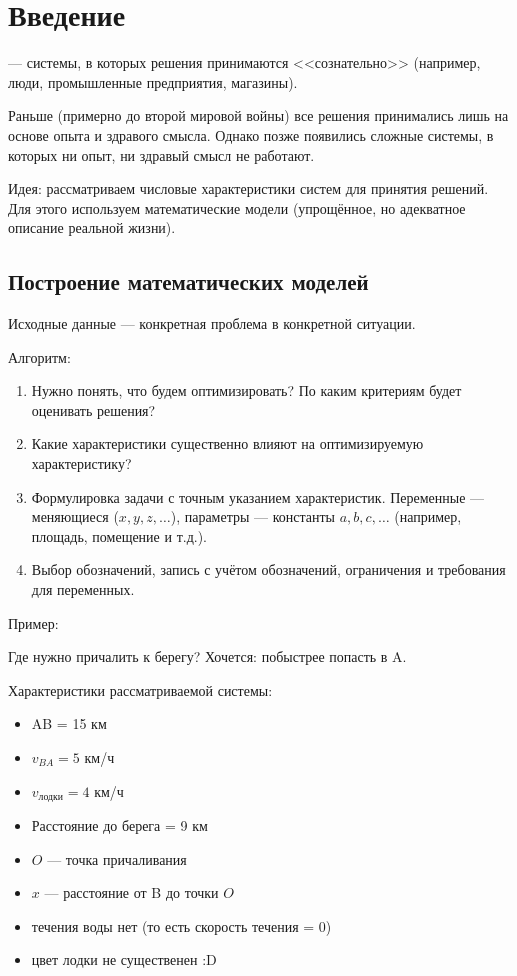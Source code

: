 \chapter{Введение}

 --- системы, в которых решения принимаются <<сознательно>> (например, люди, промышленные предприятия, магазины).

Раньше (примерно до второй мировой войны) все решения принимались лишь на основе опыта и здравого смысла. Однако позже появились сложные системы, в которых ни опыт, ни здравый смысл не работают.

Идея: рассматриваем числовые характеристики систем для принятия решений. Для этого используем математические модели (упрощённое, но адекватное описание реальной жизни).

\section{Построение математических моделей}

Исходные данные --- конкретная проблема в конкретной ситуации.

Алгоритм:
\begin{enumerate}
	\item Нужно понять, что будем оптимизировать? По каким критериям будет оценивать решения?
	
	\item Какие характеристики существенно влияют на оптимизируемую характеристику?
	
	\item Формулировка задачи с точным указанием характеристик. Переменные --- меняющиеся ($x, y, z, \dots$), параметры --- константы $a, b, c, \dots$ (например, площадь, помещение и т.д.).
	
	\item Выбор обозначений, запись с учётом обозначений, ограничения и требования для переменных.
\end{enumerate}

Пример:

Где нужно причалить к берегу? Хочется: побыстрее попасть в A.

Характеристики рассматриваемой системы:
\begin{itemize}
	\item AB = 15 км
	
	\item $v_{BA} = 5$ км/ч
	
	\item $v_{\text{лодки}} = 4$ км/ч
	
	\item Расстояние до берега = 9 км
	
	\item $O$ --- точка причаливания
	
	\item $x$ --- расстояние от B до точки $O$
	
	\item течения воды нет (то есть скорость течения = 0)
	
	\item цвет лодки не существенен :D
\end{itemize}


